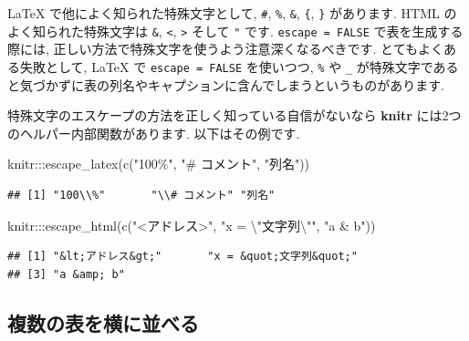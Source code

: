 \documentclass[
  11pt,
  lualatex,
  ja=standard]{bxjsreport}
\newenvironment{Shaded}{\begin{snugshade}}{\end{snugshade}}
\newcommand{\FunctionTok}[1]{\textcolor[rgb]{0.00,0.00,0.00}{#1}}
\newcommand{\NormalTok}[1]{#1}
\newcommand{\SpecialCharTok}[1]{\textcolor[rgb]{0.00,0.00,0.00}{#1}}
\newcommand{\StringTok}[1]{\textcolor[rgb]{0.31,0.60,0.02}{#1}}
\begin{document}
LaTeX で他によく知られた特殊文字として, \texttt{\#}, \texttt{\%}, \texttt{\&}, \texttt{\{}, \texttt{\}} があります. HTML のよく知られた特殊文字は \texttt{\&}, \texttt{\textless{}}, \texttt{\textgreater{}} そして \texttt{"} です. \texttt{escape = FALSE} で表を生成する際には, 正しい方法で特殊文字を使うよう注意深くなるべきです. とてもよくある失敗として, LaTeX で \texttt{escape = FALSE} を使いつつ, \texttt{\%} や \texttt{\_} が特殊文字であると気づかずに表の列名やキャプションに含んでしまうというものがあります.

特殊文字のエスケープの方法を正しく知っている自信がないなら \textbf{knitr} には2つのヘルパー内部関数があります. 以下はその例です.

\begin{Shaded}
\begin{Highlighting}[numbers=left,,]
\NormalTok{knitr}\SpecialCharTok{:::}\FunctionTok{escape\_latex}\NormalTok{(}\FunctionTok{c}\NormalTok{(}\StringTok{"100\%"}\NormalTok{, }\StringTok{"\# コメント"}\NormalTok{, }\StringTok{"列名"}\NormalTok{))}
\end{Highlighting}
\end{Shaded}

\begin{verbatim}
## [1] "100\\%"       "\\# コメント" "列名"
\end{verbatim}

\begin{Shaded}
\begin{Highlighting}[numbers=left,,]
\NormalTok{knitr}\SpecialCharTok{:::}\FunctionTok{escape\_html}\NormalTok{(}\FunctionTok{c}\NormalTok{(}\StringTok{"\textless{}アドレス\textgreater{}"}\NormalTok{, }\StringTok{"x = }\SpecialCharTok{\textbackslash{}"}\StringTok{文字列}\SpecialCharTok{\textbackslash{}"}\StringTok{"}\NormalTok{, }
  \StringTok{"a \& b"}\NormalTok{))}
\end{Highlighting}
\end{Shaded}

\begin{verbatim}
## [1] "&lt;アドレス&gt;"       "x = &quot;文字列&quot;"
## [3] "a &amp; b"
\end{verbatim}

\hypertarget{multiple-tables-siede-by-side}{%
\subsection{複数の表を横に並べる}\label{multiple-tables-siede-by-side}}
\end{document}
